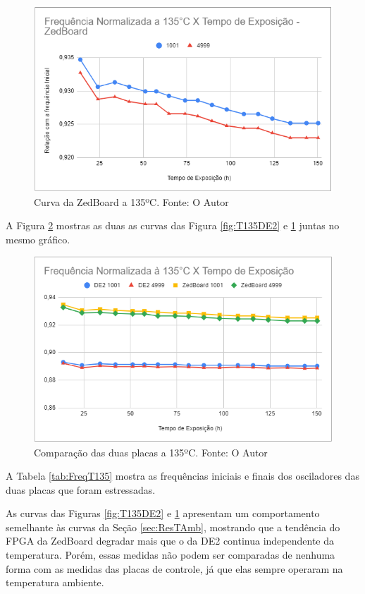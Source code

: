 \begin{figure}[H]
    \centering
    \includegraphics[scale=0.75]{figures/Resultados/T135ZedBoard}
    \caption{Curva da ZedBoard a 135ºC. Fonte: O Autor}
    \label{fig:T135ZedBoard}
\end{figure}

A Figura \ref{fig:T135Ambas} mostras as duas as curvas das Figura \ref{fig:T135DE2} e \ref{fig:T135ZedBoard} juntas no mesmo gráfico.

\begin{figure}[H]
    \centering
    \includegraphics[scale=0.75]{figures/Resultados/T135Ambas}
    \caption{Comparação das duas placas a 135ºC. Fonte: O Autor}
    \label{fig:T135Ambas}
\end{figure}

A Tabela \ref{tab:FreqT135} mostra as frequências iniciais e finais dos osciladores das duas placas que foram estressadas.



As curvas das Figuras \ref{fig:T135DE2} e \ref{fig:T135ZedBoard} apresentam um comportamento semelhante às curvas da Seção \ref{sec:ResTAmb}, mostrando que a tendência do FPGA da ZedBoard degradar mais que o da DE2 continua independente da temperatura. Porém, essas medidas não podem ser comparadas de nenhuma forma com as medidas das placas de controle, já que elas sempre operaram na temperatura ambiente.
